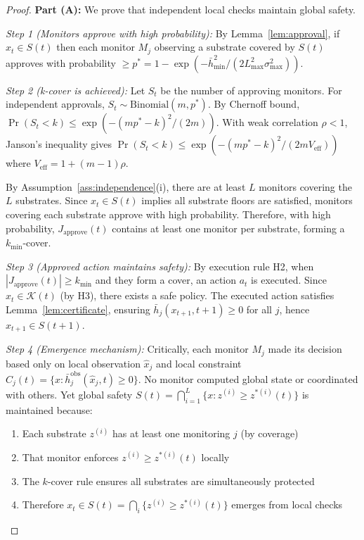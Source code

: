 \documentclass[11pt,a4paper]{article}
\begin{document}
\begin{proof}
\textbf{Part (A):} We prove that independent local checks maintain global safety. 

\emph{Step 1 (Monitors approve with high probability):} By Lemma~\ref{lem:approval}, if $x_t \in S(t)$ then each monitor $M_j$ observing a substrate covered by $S(t)$ approves with probability $\geq p^* = 1 - \exp(-\bar{h}_{\min}^2/(2L_{\max}^2\sigma_{\max}^2))$.

\emph{Step 2 (k-cover is achieved):} Let $S_t$ be the number of approving monitors. For independent approvals, $S_t \sim \text{Binomial}(m, p^*)$. By Chernoff bound, $\Pr(S_t < k) \leq \exp(-(mp^* - k)^2/(2m))$. With weak correlation $\rho < 1$, Janson's inequality gives $\Pr(S_t < k) \leq \exp(-(mp^* - k)^2/(2mV_{\text{eff}}))$ where $V_{\text{eff}} = 1 + (m-1)\rho$.

By Assumption~\ref{ass:independence}(i), there are at least $L$ monitors covering the $L$ substrates. Since $x_t \in S(t)$ implies all substrate floors are satisfied, monitors covering each substrate approve with high probability. Therefore, with high probability, $J_{\text{approve}}(t)$ contains at least one monitor per substrate, forming a $k_{\min}$-cover.

\emph{Step 3 (Approved action maintains safety):} By execution rule H2, when $|J_{\text{approve}}(t)| \geq k_{\min}$ and they form a cover, an action $a_t$ is executed. Since $x_t \in \mathcal{K}(t)$ (by H3), there exists a safe policy. The executed action satisfies Lemma~\ref{lem:certificate}, ensuring $\bar{h}_j(x_{t+1}, t+1) \geq 0$ for all $j$, hence $x_{t+1} \in S(t+1)$.

\emph{Step 4 (Emergence mechanism):} Critically, each monitor $M_j$ made its decision based only on local observation $\hat{x}_j$ and local constraint $C_j(t) = \{x: \bar{h}_j^{\text{obs}}(\hat{x}_j,t) \geq 0\}$. No monitor computed global state or coordinated with others. Yet global safety $S(t) = \bigcap_{i=1}^L \{x: z^{(i)} \geq z^{*(i)}(t)\}$ is maintained because:
\begin{enumerate}
\item Each substrate $z^{(i)}$ has at least one monitoring $j$ (by coverage)
\item That monitor enforces $z^{(i)} \geq z^{*(i)}(t)$ locally
\item The $k$-cover rule ensures all substrates are simultaneously protected
\item Therefore $x_t \in S(t) = \bigcap_i \{z^{(i)} \geq z^{*(i)}(t)\}$ emerges from local checks
\end{enumerate}


\end{proof}
\end{document}
